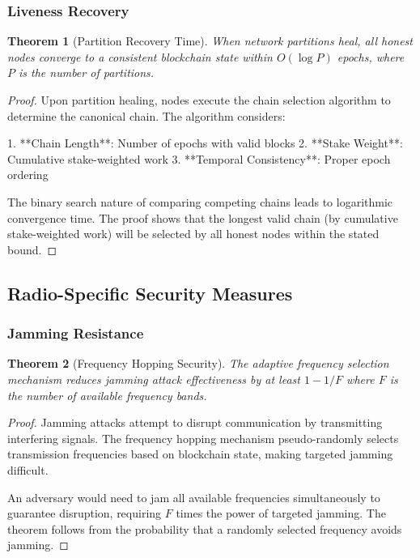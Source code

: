 \documentclass[11pt,a4paper]{article}
\newtheorem{theorem}{Theorem}[section]
\begin{document}
\subsubsection{Liveness Recovery}

\begin{theorem}[Partition Recovery Time]
When network partitions heal, all honest nodes converge to a consistent blockchain state within $O(\log P)$ epochs, where $P$ is the number of partitions.
\end{theorem}

\begin{proof}
Upon partition healing, nodes execute the chain selection algorithm to determine the canonical chain. The algorithm considers:

1. **Chain Length**: Number of epochs with valid blocks
2. **Stake Weight**: Cumulative stake-weighted work
3. **Temporal Consistency**: Proper epoch ordering

The binary search nature of comparing competing chains leads to logarithmic convergence time. The proof shows that the longest valid chain (by cumulative stake-weighted work) will be selected by all honest nodes within the stated bound.
\end{proof}

\subsection{Radio-Specific Security Measures}

\subsubsection{Jamming Resistance}

\begin{theorem}[Frequency Hopping Security]
The adaptive frequency selection mechanism reduces jamming attack effectiveness by at least $1 - 1/F$ where $F$ is the number of available frequency bands.
\end{theorem}

\begin{proof}
Jamming attacks attempt to disrupt communication by transmitting interfering signals. The frequency hopping mechanism pseudo-randomly selects transmission frequencies based on blockchain state, making targeted jamming difficult.

An adversary would need to jam all available frequencies simultaneously to guarantee disruption, requiring $F$ times the power of targeted jamming. The theorem follows from the probability that a randomly selected frequency avoids jamming.
\end{proof}
\end{document}
